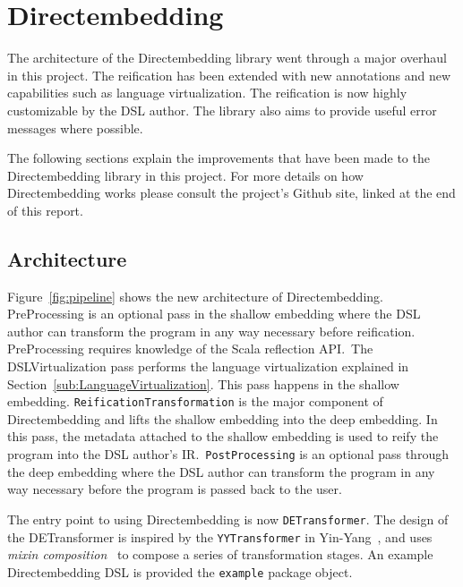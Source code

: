 \section{Directembedding} %
\label{sec:Directembedding}
The architecture of the Directembedding library went through a major overhaul in this project.
The reification has been extended with new annotations and new capabilities such as language virtualization.
The reification is now highly customizable by the DSL author.
The library also aims to provide useful error messages where possible.

The following sections explain the improvements that have been made to the Directembedding library in this project.
For more details on how Directembedding works please consult the project's Github site, linked at the end of this report.

\subsection{Architecture} %
\label{sub:Architecture}
Figure~\ref{fig:pipeline} shows the new architecture of Directembedding.
PreProcessing is an optional pass in the shallow embedding where the DSL author can transform the program in any way necessary before reification.
PreProcessing requires knowledge of the Scala reflection API.\
The DSLVirtualization pass performs the language virtualization explained in Section~\ref{sub:LanguageVirtualization}.
This pass happens in the shallow embedding.
\texttt{ReificationTransformation} is the major component of Directembedding and lifts the shallow embedding into the deep embedding.
In this pass, the metadata attached to the shallow embedding is used to reify the program into the DSL author's IR.\
\texttt{PostProcessing} is an optional pass through the deep embedding where the DSL author can transform the program in any way necessary before the program is passed back to the user.


The entry point to using Directembedding is now \texttt{DETransformer}.
The design of the DETransformer is inspired by the \texttt{YYTransformer} in Yin-Yang~\autocite{jovanovic_yin-yang:_2014}, and uses \emph{mixin composition}~\autocite{odersky_scalable_2005} to compose a series of transformation stages.
An example Directembedding DSL is provided the \texttt{example} package object.

